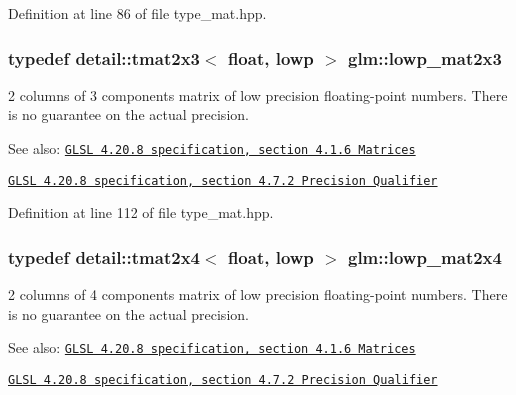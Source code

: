 Definition at line 86 of file type\_\-mat.hpp.\hypertarget{group__core__precision_gef481e637af5103a83ab561d30d28f2a}{
\subsubsection[lowp\_\-mat2x3]{\setlength{\rightskip}{0pt plus 5cm}typedef detail::tmat2x3$<$ float, lowp $>$ {\bf glm::lowp\_\-mat2x3}}}
\label{group__core__precision_gef481e637af5103a83ab561d30d28f2a}


2 columns of 3 components matrix of low precision floating-point numbers. There is no guarantee on the actual precision.

\begin{Desc}
\item[See also:]\href{http://www.opengl.org/registry/doc/GLSLangSpec.4.20.8.pdf}{\tt GLSL 4.20.8 specification, section 4.1.6 Matrices} 

\href{http://www.opengl.org/registry/doc/GLSLangSpec.4.20.8.pdf}{\tt GLSL 4.20.8 specification, section 4.7.2 Precision Qualifier} \end{Desc}


Definition at line 112 of file type\_\-mat.hpp.\hypertarget{group__core__precision_ga62e33ee2864909c8522a549fbf40ce5}{
\subsubsection[lowp\_\-mat2x4]{\setlength{\rightskip}{0pt plus 5cm}typedef detail::tmat2x4$<$ float, lowp $>$ {\bf glm::lowp\_\-mat2x4}}}
\label{group__core__precision_ga62e33ee2864909c8522a549fbf40ce5}


2 columns of 4 components matrix of low precision floating-point numbers. There is no guarantee on the actual precision.

\begin{Desc}
\item[See also:]\href{http://www.opengl.org/registry/doc/GLSLangSpec.4.20.8.pdf}{\tt GLSL 4.20.8 specification, section 4.1.6 Matrices} 

\href{http://www.opengl.org/registry/doc/GLSLangSpec.4.20.8.pdf}{\tt GLSL 4.20.8 specification, section 4.7.2 Precision Qualifier} \end{Desc}


